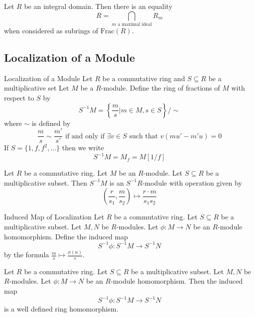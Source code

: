 \documentclass[a4paper]{article}
\begin{document}
\begin{prp}{}{} Let $R$ be an integral domain. Then there is an equality $$R=\bigcap_{m\text{ a maximal ideal}}R_m$$ when considered as subrings of $\text{Frac}(R)$.  
\end{prp}

\subsection{Localization of a Module}
\begin{defn}{Localization of a Module}{} Let $R$ be a commutative ring and $S\subseteq R$ be a multiplicative set Let $M$ be a $R$-module. Define the ring of fractions of $M$ with respect to $S$ by $$S^{-1}M=\left\{\frac{m}{s}|m\in M,s\in S\right\}/\sim$$ where $\sim$ is defined by $$\frac{m}{s}\sim\frac{m'}{s'}\text{ if and only if }\exists v\in S\text{ such that }v(mu'-m'u)=0$$ If $S=\{1,f,f^2,\dots\}$ then we write $$S^{-1}M=M_f=M[1/f]$$
\end{defn}

\begin{lmm}{}{} Let $R$ be a commutative ring. Let $M$ be an $R$-module. Let $S\subseteq R$ be a multiplicative subset. Then $S^{-1}M$ is an $S^{-1}R$-module with operation given by $$\left(\frac{r}{s_1},\frac{m}{s_2}\right)\mapsto\frac{r\cdot m}{s_1s_2}$$
\end{lmm}

\begin{defn}{Induced Map of Localization}{} Let $R$ be a commutative ring. Let $S\subseteq R$ be a multiplicative subset. Let $M,N$ be $R$-modules. Let $\phi:M\to N$ be an $R$-module homomorphism. Define the induced map $$S^{-1}\phi:S^{-1}M\to S^{-1}N$$ by the formula $\frac{m}{s}\mapsto\frac{\phi(n)}{s}$. 
\end{defn}

\begin{lmm}{}{} Let $R$ be a commutative ring. Let $S\subseteq R$ be a multiplicative subset. Let $M,N$ be $R$-modules. Let $\phi:M\to N$ be an $R$-module homomorphism. Then the induced map $$S^{-1}\phi:S^{-1}M\to S^{-1}N$$ is a well defined ring homomorphism. 
\end{lmm}
\end{document}
